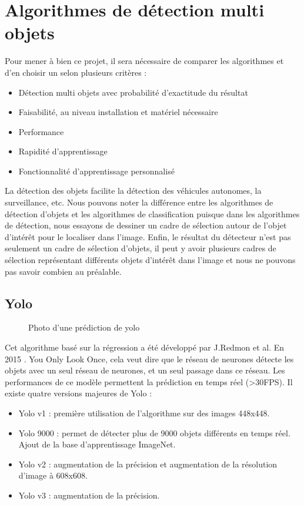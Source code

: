 \documentclass[debug,nodate,hideweeklyreports]{polytech/polytech}
\begin{document}
\section{Algorithmes de détection multi objets}
Pour mener à bien ce projet, il sera nécessaire de comparer les algorithmes et d’en choisir un selon plusieurs critères :
\begin{itemize}
\item Détection multi objets avec probabilité d’exactitude du résultat
\item Faisabilité, au niveau installation et matériel nécessaire
\item Performance
\item Rapidité d’apprentissage
\item Fonctionnalité d’apprentissage personnalisé
\end{itemize}

La détection des objets facilite la détection des véhicules autonomes, la surveillance, etc. Nous pouvons noter la différence entre les algorithmes de détection d’objets et les algorithmes de classification puisque dans les algorithmes de détection, nous essayons de dessiner un cadre de sélection autour de l’objet d’intérêt pour le localiser dans l’image. Enfin, le résultat du détecteur n’est pas seulement un cadre de sélection d’objets, il peut y avoir plusieurs cadres de sélection représentant différents objets d’intérêt dans l’image et nous ne pouvons pas savoir combien au préalable.

\subsection{Yolo}

\begin{figure}
  \caption{Photo d'une prédiction de yolo}
  \label{fig:yolo}
\end{figure}

Cet algorithme basé sur la régression a été développé par J.Redmon et al. En 2015 \cite{DBLP:journals/corr/RedmonDGF15}. You Only Look Once, cela veut dire que le réseau de neurones détecte les objets avec un seul réseau de neurones, et un seul passage dans ce réseau. Les performances de ce modèle permettent la prédiction en temps réel (>30FPS).
Il existe quatre versions majeures de Yolo :
\begin{itemize}
\item Yolo v1 : première utilisation de l’algorithme sur des images 448x448.
\item Yolo 9000 : permet de détecter plus de 9000 objets différents en temps réel. Ajout de la base d’apprentissage ImageNet.
\item Yolo v2 : augmentation de la précision et augmentation de la résolution d’image à 608x608.
\item Yolo v3 : augmentation de la précision.\cite{DBLP:journals/corr/abs-1804-02767}
\end{itemize}
\end{document}
